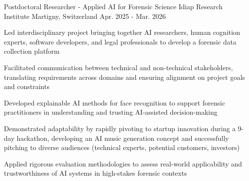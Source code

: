

\begin{cventries}

\cventry
    {Postdoctoral Researcher - Applied AI for Forensic Science} %
    {Idiap Research Institute} %
    {Martigny, Switzerland} %
    {Apr. 2025 - Mar. 2026} %
    {
      \begin{cvitems} %
        \item {Led interdisciplinary project bringing together AI researchers, human cognition experts, software developers, and legal professionals to develop a forensic data collection platform}
        \item {Facilitated communication between technical and non-technical stakeholders, translating requirements across domains and ensuring alignment on project goals and constraints}
        \item {Developed explainable AI methods for face recognition to support forensic practitioners in understanding and trusting AI-assisted decision-making}
        \item {Demonstrated adaptability by rapidly pivoting to startup innovation during a 9-day hackathon, developing an AI music generation concept and successfully pitching to diverse audiences (technical experts, potential customers, investors)}
        \item {Applied rigorous evaluation methodologies to assess real-world applicability and trustworthiness of AI systems in high-stakes forensic contexts}
      \end{cvitems}
    }


\end{cventries}
